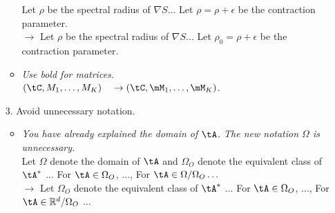 \documentclass[11pt]{article}
\theoremstyle{plain}
\theoremstyle{definition}
\begin{document}
\begin{enumerate}
\begin{itemize}
Let $\rho$ be the spectral radius of $\nabla S$... Let $\rho = \rho + \epsilon$ be the contraction parameter.\\
$\rightarrow$ Let $\rho$ be the spectral radius of $\nabla S$... Let $\rho_0 = \rho + \epsilon$ be the contraction parameter.
\item \textit{Use bold for matrices.}\\
$(\tC, M_1, \dots,M_K) \quad \rightarrow (\tC, \mM_1,\dots,\mM_K)$. 
    \end{itemize}
    \item[3.] Avoid unnecessary notation. 
    \begin{itemize} 
        \item \textit{You have already explained the domain of $\tA$. The new notation $\Omega$ is unnecessary.}\\
        Let $\Omega$ denote the domain of $\tA$ and $\Omega_O$ denote the equivalent class of $\tA^*$ ... For $\tA \in \Omega_O$, $\dots$, For $\tA \in \Omega/\Omega_O \dots$ \\
        $\rightarrow$ Let $\Omega_O$ denote the equivalent class of $\tA^*$ ... For $\tA \in \Omega_O$, $\dots$, For $\tA \in \mathbb{R}^d/\Omega_O$ $\dots$
    \end{itemize}
\end{enumerate}
\end{document}
